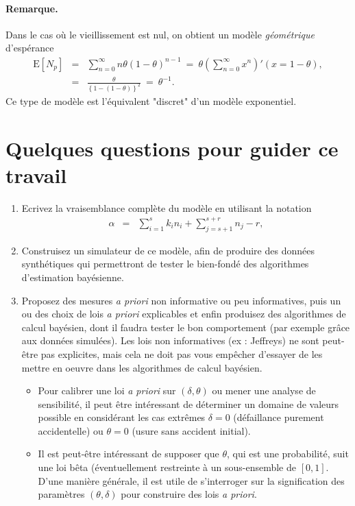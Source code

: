 \documentclass[10pt]{article}
\newcommand{\E}{\mbox{E}}
\newcommand{\1}{\mathbbm{1}}
\begin{document}
\paragraph{Remarque.}
Dans le cas o\`u le vieillissement est nul, on obtient un mod\`ele {\it g\'eom\'etrique} d'esp\'erance
\begin{eqnarray*}
\E[N_p] & = & \sum\limits_{n=0}^{\infty} n\theta(1-\theta)^{n-1}
        \ = \ \theta \left(\sum\limits_{n=0}^{\infty} x^n\right)'(x=1-\theta), \\
        & = & \frac{\theta}{\left\{1-(1-\theta)\right\}^2}
        \ = \ \theta^{-1}.
\end{eqnarray*}
Ce type de mod\`ele est l'\'equivalent "discret" d'un mod\`ele exponentiel. 

\section{Quelques questions pour guider ce travail}

\begin{enumerate}
\item Ecrivez la vraisemblance compl\`ete du mod\`ele en utilisant la notation
\begin{eqnarray*}
\alpha & = & \sum\limits_{i=1}^s k_i n_i + \sum\limits_{j=s+1}^{s+r} n_j - r,
\end{eqnarray*}
\item Construisez un simulateur de ce mod\`ele, afin de produire des donn\'ees synth\'etiques qui permettront de tester le bien-fond\'e des algorithmes d'estimation bay\'esienne.
\item Proposez des mesures {\it a priori} non informative ou peu informatives, puis un ou des choix de lois {\it a priori} explicables et enfin produisez des algorithmes de calcul bay\'esien, dont il faudra tester le bon comportement (par exemple gr\^ace aux donn\'ees simul\'ees). Les lois non informatives (ex : Jeffreys) ne sont peut-\^etre pas explicites, mais cela ne doit pas vous emp\^echer d'essayer de les mettre en oeuvre dans les algorithmes de calcul bay\'esien.
\begin{itemize}
\item Pour calibrer une loi {\it a priori} sur $(\delta,\theta)$ ou mener une analyse de sensibilit\'e, il peut \^etre int\'eressant de d\'eterminer un domaine de valeurs possible en consid\'erant les cas extr\^emes $\delta=0$ (d\'efaillance purement accidentelle) ou $\theta=0$ (usure sans accident initial).
\item Il est peut-\^etre int\'eressant de supposer que $\theta$, qui est une probabilit\'e, suit une loi b\^eta (\'eventuellement restreinte \`a un sous-ensemble de $[0,1]$. D'une mani\`ere g\'en\'erale, il est utile de s'interroger sur la signification des param\`etres $(\theta,\delta)$ pour construire des lois {\it a priori}. 
\end{itemize}
\end{enumerate}



\end{document}
